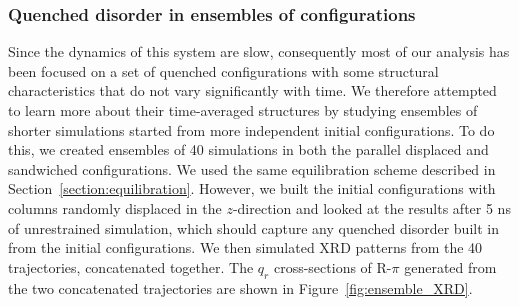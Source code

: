 \documentclass[journal=jpcbfk,manuscript=article]{achemso}
\begin{document}
%
  
  \subsubsection*{Quenched disorder in ensembles of configurations}  

  Since the dynamics of this system are slow, consequently most of our analysis
  has been focused on a set of quenched configurations with some structural
  characteristics that do not vary significantly with time. We therefore
  attempted to learn more about their time-averaged structures by studying
  ensembles of shorter simulations started from more independent initial
  configurations. To do this, we created ensembles of 40 simulations in both the
  parallel displaced and sandwiched configurations. We used the same
  equilibration scheme described in Section~\ref{section:equilibration}.
  However, we built the initial configurations with columns randomly displaced in
  the $z$-direction and looked at the results after 5 ns of unrestrained
  simulation, which should capture any quenched disorder built in from the
  initial configurations. We then simulated XRD patterns from the 40
  trajectories, concatenated together. The $q_r$ cross-sections of R-$\pi$
  generated from the two concatenated trajectories are shown in
  Figure~\ref{fig:ensemble_XRD}. 
  
\end{document}
